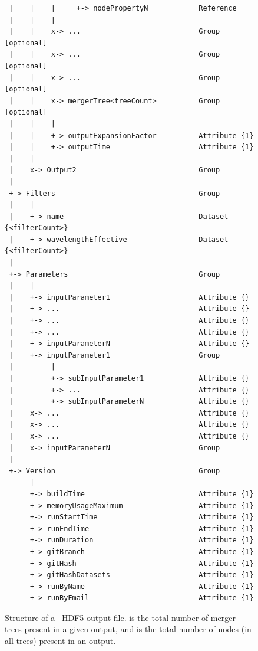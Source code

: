 \begin{figure}
\begin{center}
\begin{verbatim}
 |    |    |     +-> nodePropertyN            Reference
 |    |    |
 |    |    x-> ...                            Group              [optional]
 |    |    x-> ...                            Group              [optional]
 |    |    x-> ...                            Group              [optional]
 |    |    x-> mergerTree<treeCount>          Group              [optional]
 |    |    |
 |    |    +-> outputExpansionFactor          Attribute {1}
 |    |    +-> outputTime                     Attribute {1}
 |    |
 |    x-> Output2                             Group
 |
 +-> Filters                                  Group
 |    |
 |    +-> name                                Dataset   {<filterCount>}
 |    +-> wavelengthEffective                 Dataset   {<filterCount>}
 |
 +-> Parameters                               Group
 |    |
 |    +-> inputParameter1                     Attribute {}
 |    +-> ...                                 Attribute {}
 |    +-> ...                                 Attribute {}
 |    +-> ...                                 Attribute {}
 |    +-> inputParameterN                     Attribute {}
 |    +-> inputParameter1                     Group
 |         |
 |         +-> subInputParameter1             Attribute {}
 |         +-> ...                            Attribute {}
 |         +-> subInputParameterN             Attribute {}
 |    x-> ...                                 Attribute {}
 |    x-> ...                                 Attribute {}
 |    x-> ...                                 Attribute {}
 |    x-> inputParameterN                     Group
 |
 +-> Version                                  Group
      |
      +-> buildTime                           Attribute {1}
      +-> memoryUsageMaximum                  Attribute {1}
      +-> runStartTime                        Attribute {1}
      +-> runEndTime                          Attribute {1}
      +-> runDuration                         Attribute {1}
      +-> gitBranch                           Attribute {1}
      +-> gitHash                             Attribute {1}
      +-> gitHashDatasets                     Attribute {1}
      +-> runByName                           Attribute {1}
      +-> runByEmail                          Attribute {1}
\end{verbatim}
\end{center}
\caption{Structure of a \glc\ HDF5 output file.  is the total number of merger trees present in a given output, and  is the total number of nodes (in all trees) present in an output.}
\label{fig:glcOutputFileStructure}
\end{figure}

